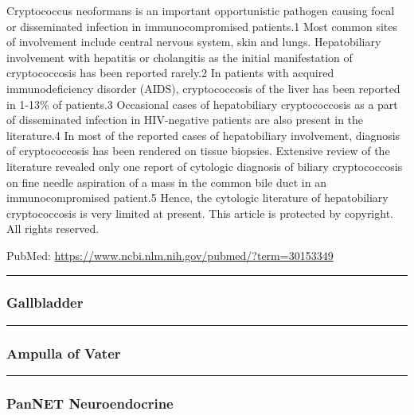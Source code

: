 \documentclass[]{article}
\begin{document}
Cryptococcus neoformans is an important opportunistic pathogen causing
focal or disseminated infection in immunocompromised patients.1 Most
common sites of involvement include central nervous system, skin and
lungs. Hepatobiliary involvement with hepatitis or cholangitis as the
initial manifestation of cryptococcosis has been reported rarely.2 In
patients with acquired immunodeficiency disorder (AIDS), cryptococcosis
of the liver has been reported in 1-13\% of patients.3 Occasional cases
of hepatobiliary cryptococcosis as a part of disseminated infection in
HIV-negative patients are also present in the literature.4 In most of
the reported cases of hepatobiliary involvement, diagnosis of
cryptococcosis has been rendered on tissue biopsies. Extensive review of
the literature revealed only one report of cytologic diagnosis of
biliary cryptococcosis on fine needle aspiration of a mass in the common
bile duct in an immunocompromised patient.5 Hence, the cytologic
literature of hepatobiliary cryptococcosis is very limited at present.
This article is protected by copyright. All rights reserved.

PubMed: \url{https://www.ncbi.nlm.nih.gov/pubmed/?term=30153349}

{}

{}

\begin{center}\rule{0.5\linewidth}{\linethickness}\end{center}

\hypertarget{gallbladder-1}{%
\subsubsection{Gallbladder}\label{gallbladder-1}}

\begin{center}\rule{0.5\linewidth}{\linethickness}\end{center}

\hypertarget{ampulla-of-vater-1}{%
\subsubsection{Ampulla of Vater}\label{ampulla-of-vater-1}}

\begin{center}\rule{0.5\linewidth}{\linethickness}\end{center}

\hypertarget{pannet-neuroendocrine-1}{%
\subsubsection{PanNET Neuroendocrine}\label{pannet-neuroendocrine-1}}
\end{document}
